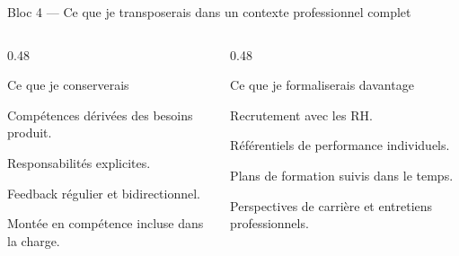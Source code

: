 \begin{frame}{Bloc 4 — Ce que je transposerais dans un contexte professionnel complet}
\begin{columns}[T]
\begin{column}{0.48\linewidth}
\begin{block}{Ce que je conserverais}
\begin{tightitems}
  \item Compétences dérivées des besoins produit.
  \item Responsabilités explicites.
  \item Feedback régulier et bidirectionnel.
  \item Montée en compétence incluse dans la charge.
\end{tightitems}
\end{block}
\end{column}
\begin{column}{0.48\linewidth}
\begin{block}{Ce que je formaliserais davantage}
\begin{tightitems}
  \item Recrutement avec les RH.
  \item Référentiels de performance individuels.
  \item Plans de formation suivis dans le temps.
  \item Perspectives de carrière et entretiens professionnels.
\end{tightitems}
\end{block}
\end{column}
\end{columns}
\end{frame}
